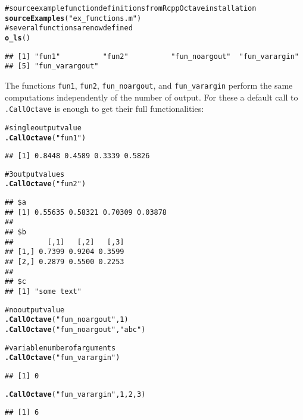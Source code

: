 \documentclass[english,10pt,a4paper]{article}\usepackage{graphicx, color}
\makeatletter
\newcommand{\hlfunctioncall}[1]{\textcolor[rgb]{0.501960784313725,0,0.329411764705882}{\textbf{#1}}}%
\newcommand{\hlstring}[1]{\textcolor[rgb]{0.6,0.6,1}{#1}}%
\newcommand{\hlcomment}[1]{\textcolor[rgb]{0.180392156862745,0.6,0.341176470588235}{#1}}%
\newenvironment{kframe}{%
 \def\at@end@of@kframe{}%
 \ifinner\ifhmode%
  \def\at@end@of@kframe{\end{minipage}}%
  \begin{minipage}{\columnwidth}%
 \fi\fi%
 \def\FrameCommand##1{\hskip\@totalleftmargin \hskip-\fboxsep
 \colorbox{shadecolor}{##1}\hskip-\fboxsep
     \hskip-\linewidth \hskip-\@totalleftmargin \hskip\columnwidth}%
 \MakeFramed {\advance\hsize-\width
   \@totalleftmargin\z@ \linewidth\hsize
   \@setminipage}}%
 {\par\unskip\endMakeFramed%
 \at@end@of@kframe}
\newenvironment{knitrout}{}{} %
\let\code=\texttt
\makeatother
\begin{document}
\begin{knitrout}
\color{fgcolor}\begin{kframe}
\begin{alltt}
\hlcomment{# source example function definitions from RcppOctave installation}
\hlfunctioncall{sourceExamples}(\hlstring{"ex_functions.m"})
\hlcomment{# several functions are now defined}
\hlfunctioncall{o_ls}()
\end{alltt}
\begin{verbatim}
## [1] "fun1"          "fun2"          "fun_noargout"  "fun_varargin" 
## [5] "fun_varargout"
\end{verbatim}
\end{kframe}
\end{knitrout}


The functions \code{fun1}, \code{fun2}, \code{fun\_noargout}, and
\code{fun\_varargin} perform the same computations independently of the number
of output.
For these a default call to \code{.CallOctave} is enough to get their full
functionalities:

\begin{knitrout}
\color{fgcolor}\begin{kframe}
\begin{alltt}
\hlcomment{# single output value}
\hlfunctioncall{.CallOctave}(\hlstring{"fun1"})
\end{alltt}
\begin{verbatim}
## [1] 0.8448 0.4589 0.3339 0.5826
\end{verbatim}
\begin{alltt}
\hlcomment{# 3 output values}
\hlfunctioncall{.CallOctave}(\hlstring{"fun2"})
\end{alltt}
\begin{verbatim}
## $a
## [1] 0.55635 0.58321 0.70309 0.03878
## 
## $b
##        [,1]   [,2]   [,3]
## [1,] 0.7399 0.9204 0.3599
## [2,] 0.2879 0.5500 0.2253
## 
## $c
## [1] "some text"
\end{verbatim}
\begin{alltt}

\hlcomment{# no output value}
\hlfunctioncall{.CallOctave}(\hlstring{"fun_noargout"}, 1)
\hlfunctioncall{.CallOctave}(\hlstring{"fun_noargout"}, \hlstring{"abc"})

\hlcomment{# variable number of arguments}
\hlfunctioncall{.CallOctave}(\hlstring{"fun_varargin"})
\end{alltt}
\begin{verbatim}
## [1] 0
\end{verbatim}
\begin{alltt}
\hlfunctioncall{.CallOctave}(\hlstring{"fun_varargin"}, 1, 2, 3)
\end{alltt}
\begin{verbatim}
## [1] 6
\end{verbatim}
\end{kframe}
\end{knitrout}
\end{document}
